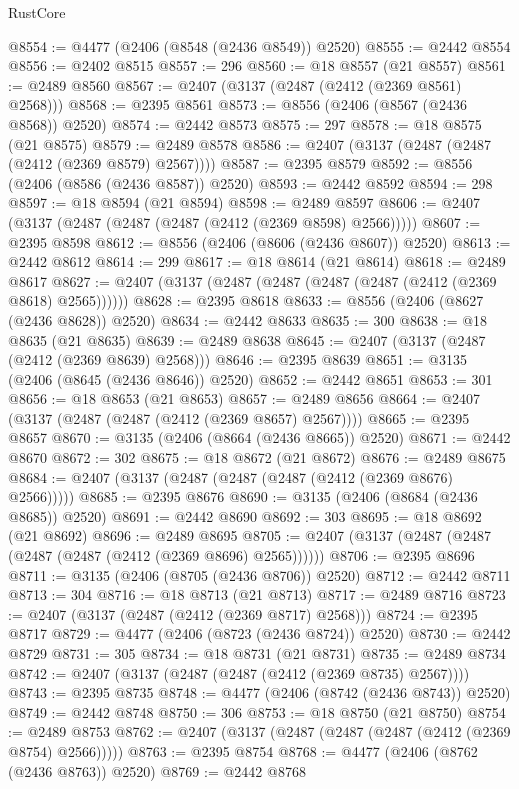 \begin{lexlean}{RustCore}
\begin{coremodule}
@8554 := @4477 (@2406 (@8548 (@2436 @8549)) @2520)
@8555 := @2442 @8554
@8556 := @2402 @8515
@8557 := 296
@8560 := @18 @8557 (@21 @8557)
@8561 := @2489 @8560
@8567 := @2407 (@3137 (@2487 (@2412 (@2369 @8561) @2568)))
@8568 := @2395 @8561
@8573 := @8556 (@2406 (@8567 (@2436 @8568)) @2520)
@8574 := @2442 @8573
@8575 := 297
@8578 := @18 @8575 (@21 @8575)
@8579 := @2489 @8578
@8586 := @2407 (@3137 (@2487 (@2487 (@2412 (@2369 @8579) @2567))))
@8587 := @2395 @8579
@8592 := @8556 (@2406 (@8586 (@2436 @8587)) @2520)
@8593 := @2442 @8592
@8594 := 298
@8597 := @18 @8594 (@21 @8594)
@8598 := @2489 @8597
@8606 := @2407 (@3137 (@2487 (@2487 (@2487 (@2412 (@2369 @8598) @2566)))))
@8607 := @2395 @8598
@8612 := @8556 (@2406 (@8606 (@2436 @8607)) @2520)
@8613 := @2442 @8612
@8614 := 299
@8617 := @18 @8614 (@21 @8614)
@8618 := @2489 @8617
@8627 := @2407 (@3137 (@2487 (@2487 (@2487 (@2487 (@2412 (@2369 @8618) @2565))))))
@8628 := @2395 @8618
@8633 := @8556 (@2406 (@8627 (@2436 @8628)) @2520)
@8634 := @2442 @8633
@8635 := 300
@8638 := @18 @8635 (@21 @8635)
@8639 := @2489 @8638
@8645 := @2407 (@3137 (@2487 (@2412 (@2369 @8639) @2568)))
@8646 := @2395 @8639
@8651 := @3135 (@2406 (@8645 (@2436 @8646)) @2520)
@8652 := @2442 @8651
@8653 := 301
@8656 := @18 @8653 (@21 @8653)
@8657 := @2489 @8656
@8664 := @2407 (@3137 (@2487 (@2487 (@2412 (@2369 @8657) @2567))))
@8665 := @2395 @8657
@8670 := @3135 (@2406 (@8664 (@2436 @8665)) @2520)
@8671 := @2442 @8670
@8672 := 302
@8675 := @18 @8672 (@21 @8672)
@8676 := @2489 @8675
@8684 := @2407 (@3137 (@2487 (@2487 (@2487 (@2412 (@2369 @8676) @2566)))))
@8685 := @2395 @8676
@8690 := @3135 (@2406 (@8684 (@2436 @8685)) @2520)
@8691 := @2442 @8690
@8692 := 303
@8695 := @18 @8692 (@21 @8692)
@8696 := @2489 @8695
@8705 := @2407 (@3137 (@2487 (@2487 (@2487 (@2487 (@2412 (@2369 @8696) @2565))))))
@8706 := @2395 @8696
@8711 := @3135 (@2406 (@8705 (@2436 @8706)) @2520)
@8712 := @2442 @8711
@8713 := 304
@8716 := @18 @8713 (@21 @8713)
@8717 := @2489 @8716
@8723 := @2407 (@3137 (@2487 (@2412 (@2369 @8717) @2568)))
@8724 := @2395 @8717
@8729 := @4477 (@2406 (@8723 (@2436 @8724)) @2520)
@8730 := @2442 @8729
@8731 := 305
@8734 := @18 @8731 (@21 @8731)
@8735 := @2489 @8734
@8742 := @2407 (@3137 (@2487 (@2487 (@2412 (@2369 @8735) @2567))))
@8743 := @2395 @8735
@8748 := @4477 (@2406 (@8742 (@2436 @8743)) @2520)
@8749 := @2442 @8748
@8750 := 306
@8753 := @18 @8750 (@21 @8750)
@8754 := @2489 @8753
@8762 := @2407 (@3137 (@2487 (@2487 (@2487 (@2412 (@2369 @8754) @2566)))))
@8763 := @2395 @8754
@8768 := @4477 (@2406 (@8762 (@2436 @8763)) @2520)
@8769 := @2442 @8768

\end{coremodule}
\end{lexlean}
